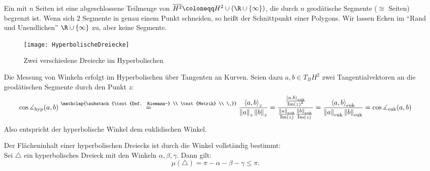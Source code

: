 \begin{definition}
  Ein  mit \( n \) Seiten ist eine abgeschlossene Teilmenge von \( \overline{H^2} \coloneqq H^2 \cup \left( \R \cup \left \{ \infty \right \} \right) \), die durch \( n \) geodätische Segmente (\( \cong \) Seiten) begrenzt ist. Wenn sich \( 2 \) Segmente in genau einem Punkt schneiden, so heißt der Schnittpunkt  einer Polygons. Wir lassen Ecken im ``Rand und Unendlichen'' \( \R \cup \left \{ \infty \right \} \) zu, aber keine Segmente.
  \begin{figure}[H]
    \texttt{[image: HyperbolischeDreiecke]}
    \caption{Zwei verschiedene Dreiecke im Hyperbolischen}
  \end{figure}
\end{definition}

\begin{remark}
  Die Messung von Winkeln erfolgt im Hyperbolischen über Tangenten an Kurven. Seien dazu \( a, b \in T_B H^2 \) zwei Tangentialvektoren an die geodätischen Segmente durch den Punkt \( z \):
  \begin{equation*}
    \cos \measuredangle_\text{hyp}(a,b) \overset{\mathclap{\substack{\text{Def. Riemann-} \\ \text{Metrik} \\ \ }}}{=} \frac{\left\langle a,b \right\rangle_z}{\left\Vert a \right\Vert_z \left\Vert b \right\Vert_z} = \frac{\frac{\left\langle a,b \right\rangle_\text{euk}}{\text{Im}{(z)}^2}}{\frac{\left\Vert a \right\Vert_{\text{euk}}}{\text{Im}(z)} \frac{\left\Vert b \right\Vert_{\text{euk}}}{\text{Im}(z)}} = \frac{\left\langle a,b \right\rangle_\text{euk}}{\left\Vert a \right\Vert_\text{euk} \left\Vert b \right\Vert_\text{euk}} = \cos \measuredangle_\text{euk}(a,b)
  \end{equation*}
  Also entspricht der hyperbolische Winkel dem euklidischen Winkel.
\end{remark}

\begin{theorem}
  Der Flächeninhalt einer hyperbolischen Dreiecks ist durch die Winkel vollständig bestimmt: \\
  Sei \( \triangle \) ein hyperbolisches Dreieck mit den Winkeln \( \alpha, \beta, \gamma \). Dann gilt:
  \begin{equation*}
    \mu(\triangle) = \pi - \alpha - \beta - \gamma \leq \pi\text{.}
  \end{equation*}
\end{theorem}

